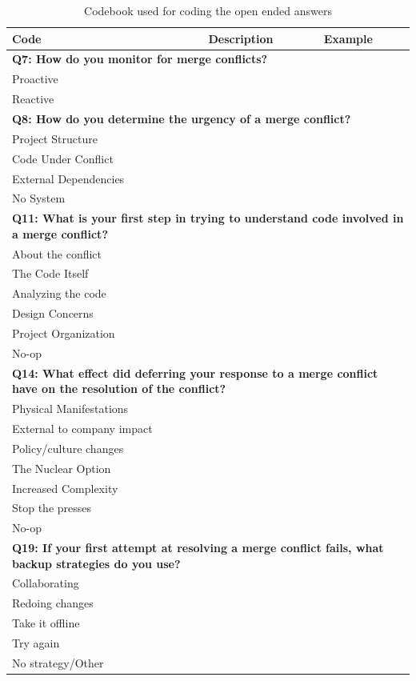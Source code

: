 \def\shift{\hspace{0.5em}}
\begin{table}[!htbp]
\centering
\caption{Codebook used for coding the open ended answers}
\label{tab:codes}
\begin{tabular}{lp{1.5in}p{1.3in}}
\toprule
Code & Description & Example \\
\midrule
\multicolumn{3}{l}{\textbf{Q7: How do you monitor for merge conflicts?}} \\
\shift Proactive & & \\
\shift Reactive & & \\
\midrule
\multicolumn{3}{l}{\textbf{Q8: How do you determine the urgency of a merge conflict?}} \\
\shift Project Structure & & \\
\shift Code Under Conflict & & \\
\shift External Dependencies & & \\
\shift No System & & \\
\midrule
\multicolumn{3}{p{4.5in}}{\raggedright\textbf{Q11: What is your first step in trying to understand code involved in a merge conflict?}} \\
\shift About the conflict & & \\
\shift The Code Itself & & \\
\shift Analyzing the code & & \\
\shift Design Concerns & & \\
\shift Project Organization & & \\
\shift No-op & & \\
\midrule
\multicolumn{3}{p{4.5in}}{\raggedright\textbf{Q14: What effect did deferring your response to a merge conflict have on the resolution of the conflict?}} \\
\shift Physical Manifestations & & \\
\shift External to company impact & & \\
\shift Policy/culture changes & & \\
\shift The Nuclear Option & & \\
\shift Increased Complexity & & \\
\shift Stop the presses & & \\
\shift No-op & & \\
\midrule
\multicolumn{3}{p{4.5in}}{\raggedright\textbf{Q19: If your first attempt at resolving a merge conflict fails, what backup strategies do you use?}} \\
\shift Collaborating & & \\
\shift Redoing changes & & \\
\shift Take it offline & & \\
\shift Try again & & \\
\shift No strategy/Other & & \\
\bottomrule
\end{tabular}	
\end{table}
